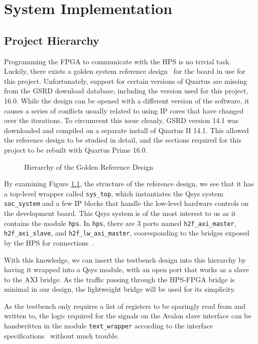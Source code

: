 \chapter{System Implementation}

\section{Project Hierarchy}
Programming the FPGA to communicate with the HPS is no trivial task.
Luckily, there exists a golden system reference design~\cite{Rocket1} for the board in use for this project.
Unfortunately, support for certain versions of Quartus are missing from the GSRD download database, including the version used for this project, 16.0.
While the design can be opened with a different version of the software, it causes a series of conflicts usually related to using IP cores that have changed over the iterations.
To circumvent this issue cleanly, GSRD version 14.1 was downloaded and compiled on a separate install of Quartus II 14.1.
This allowed the reference design to be studied in detail, and the sections required for this project to be rebuilt with Quartus Prime 16.0.

\begin{figure}[H]
  \centering
  
  \caption{Hierarchy of the Golden Reference Design}
  \label{Golden Hierarchy}
\end{figure}

By examining Figure \ref{Golden Hierarchy}, the structure of the reference design, we see that it has a top-level wrapper called \texttt{sys\_top}, which instantiates the Qsys system \texttt{soc\_system} and a few IP blocks that handle the low-level hardware controls on the development board.
This Qsys system is of the most interest to us as it contains the module \texttt{hps}.
In \texttt{hps}, there are 3 ports named \texttt{h2f\_axi\_master}, \texttt{h2f\_axi\_slave}, and \texttt{h2f\_lw\_axi\_master}, cooresponding to the bridges exposed by the HPS for connections~\cite{Altera6}.

With this knowledge, we can insert the testbench design into this hierarchy by having it wrapped into a Qsys module, with an open port that works as a slave to the AXI bridge.
As the traffic passing through the HPS-FPGA bridge is minimal in our design, the lightweight bridge will be used for its simplicity.

As the testbench only requires a list of registers to be sparingly read from and written to, the logic required for the signals on the Avalon slave interface can be handwritten in the module \texttt{text\_wrapper} according to the interface specifications~\cite{Intel3} without much trouble.

